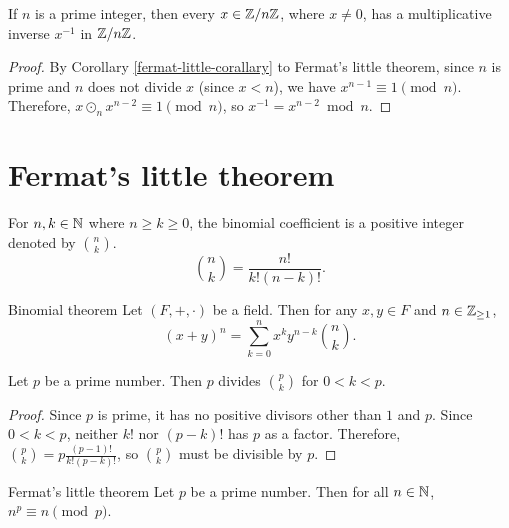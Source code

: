 \begin{thm}\label{znz-prime-field}
    If $n$ is a prime integer, then every $x \in \mathbb{Z}/n\mathbb{Z}$, where $x \neq 0$, has a multiplicative inverse $x^{-1}$ in $\mathbb{Z}/n\mathbb{Z}$.
\end{thm}

\begin{proof}
    By Corollary \ref{fermat-little-corallary} to Fermat's little theorem, since $n$ is prime and $n$ does not divide $x$ (since $x < n$), we have $x^{n-1} \equiv 1 \pmod n$. Therefore, $x \odot_n x^{n-2} \equiv 1 \pmod n$, so $x^{-1} = x^{n-2} \bmod n$.
\end{proof}

\section{Fermat's little theorem}

\begin{defn}
    For $n, k \in \mathbb{N}$ where $n \geq k \geq 0$, the binomial coefficient is a positive integer denoted by $\binom{n}{k}$. \[\binom{n}{k} = \frac{n!}{k!(n-k)!}.\]
\end{defn}

\begin{thm}{Binomial theorem}\label{binomial-theorem-ref}\proofbreak
    Let $(F, +, \cdot)$ be a field. Then for any $x, y \in F$ and $n \in \mathbb{Z}_{\geq 1}$, \[\left(x + y\right)^n = \sum_{k=0}^n x^ky^{n-k}{\binom{n}{k}}.\]
\end{thm}

\begin{lemma}\label{prime-divisible-combination}
    Let $p$ be a prime number. Then $p$ divides $\binom{p}{k}$ for $0 < k < p$.
\end{lemma}

\begin{proof}
    Since $p$ is prime, it has no positive divisors other than $1$ and $p$. Since $0 < k < p$, neither $k!$ nor $(p-k)!$ has $p$ as a factor. Therefore, $\binom{p}{k} = p\frac{(p-1)!}{k!(p-k)!}$, so $\binom{p}{k}$ must be divisible by $p$.
\end{proof}

\begin{thm}{Fermat's little theorem}\label{fermat-little-theorem}\proofbreak
    Let $p$ be a prime number. Then for all $n \in \mathbb{N}$, $n^p \equiv n \pmod p$.
\end{thm}

